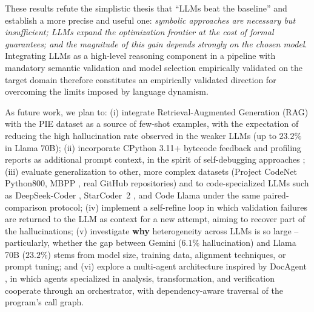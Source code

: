 \documentclass[conference]{IEEEtran}
\begin{document}
These results refute the simplistic thesis that ``LLMs beat the baseline'' and establish a more precise and useful one: \emph{symbolic approaches are necessary but insufficient; LLMs expand the optimization frontier at the cost of formal guarantees; and the magnitude of this gain depends strongly on the chosen model}. Integrating LLMs as a high-level reasoning component in a pipeline with mandatory semantic validation and model selection empirically validated on the target domain therefore constitutes an empirically validated direction for overcoming the limits imposed by language dynamism.

As future work, we plan to: (i) integrate Retrieval-Augmented Generation (RAG) \cite{DBLP:journals/corr/abs-2005-11401} with the PIE dataset \cite{DBLP:journals/corr/abs-2302-07867} as a source of few-shot examples, with the expectation of reducing the high hallucination rate observed in the weaker LLMs (up to $23.2\%$ in Llama 70B); (ii) incorporate CPython 3.11+ bytecode feedback and profiling reports as additional prompt context, in the spirit of self-debugging approaches \cite{DBLP:journals/corr/abs-2304-05128}; (iii) evaluate generalization to other, more complex datasets (Project CodeNet Python800, MBPP \cite{DBLP:journals/corr/abs-2108-07732}, real GitHub repositories) and to code-specialized LLMs such as DeepSeek-Coder \cite{DBLP:journals/corr/abs-2401-14196}, StarCoder~2 \cite{DBLP:journals/corr/abs-2402-19173}, and Code Llama \cite{DBLP:journals/corr/abs-2308-12950} under the same paired-comparison protocol; (iv) implement a self-refine loop \cite{DBLP:journals/corr/abs-2303-17651} in which validation failures are returned to the LLM as context for a new attempt, aiming to recover part of the hallucinations; (v) investigate \textbf{why} heterogeneity across LLMs is so large -- particularly, whether the gap between Gemini ($6.1\%$ hallucination) and Llama 70B ($23.2\%$) stems from model size, training data, alignment techniques, or prompt tuning; and (vi) explore a multi-agent architecture inspired by DocAgent \cite{DBLP:journals/corr/abs-2504-08725}, in which agents specialized in analysis, transformation, and verification cooperate through an orchestrator, with dependency-aware traversal of the program's call graph.
\end{document}
